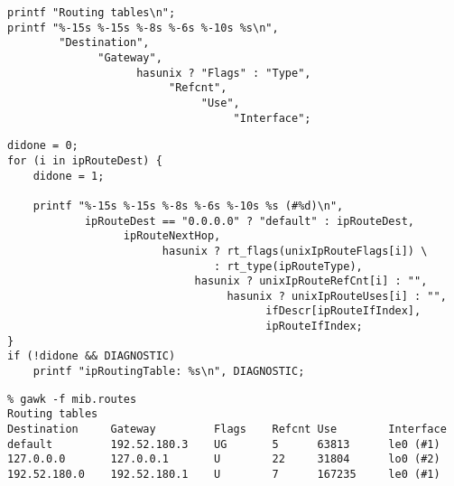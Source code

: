 \begin{bwslide}

\vspace{0.5in}
\smaller
\begin{verbatim}
printf "Routing tables\n";
printf "%-15s %-15s %-8s %-6s %-10s %s\n",
        "Destination",
              "Gateway",
                    hasunix ? "Flags" : "Type",
                         "Refcnt",
                              "Use",
                                   "Interface";
\end{verbatim}
\end{bwslide}


\begin{bwslide}

\vspace{0.5in}
\smaller
\begin{verbatim}
didone = 0;
for (i in ipRouteDest) {
    didone = 1;

    printf "%-15s %-15s %-8s %-6s %-10s %s (#%d)\n",
            ipRouteDest == "0.0.0.0" ? "default" : ipRouteDest,
                  ipRouteNextHop,
                        hasunix ? rt_flags(unixIpRouteFlags[i]) \
                                : rt_type(ipRouteType),
                             hasunix ? unixIpRouteRefCnt[i] : "",
                                  hasunix ? unixIpRouteUses[i] : "",
                                        ifDescr[ipRouteIfIndex],
                                        ipRouteIfIndex;
}
if (!didone && DIAGNOSTIC)
    printf "ipRoutingTable: %s\n", DIAGNOSTIC;
\end{verbatim}
\end{bwslide}


\begin{bwslide}

\vspace{0.5in}
\smaller
\begin{verbatim}
% gawk -f mib.routes
Routing tables
Destination     Gateway         Flags    Refcnt Use        Interface
default         192.52.180.3    UG       5      63813      le0 (#1)
127.0.0.0       127.0.0.1       U        22     31804      lo0 (#2)
192.52.180.0    192.52.180.1    U        7      167235     le0 (#1)
\end{verbatim}
\end{bwslide}
